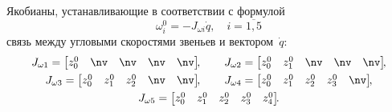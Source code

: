 Якобианы, устанавливающие в соответствии с формулой
\begin{equation}\label{eq_work_of_ang_jacobians}
    \omega^0_{i} = -J_{\omega i}\dot{q}, \quad i = \overline{1,5}
\end{equation}
связь между угловыми скоростями звеньев и вектором~$\dot{q}$:
\begin{gather}
    J_{\omega 1} =
    \begin{bmatrix}
        z^0_0 & \nv & \nv & \nv & \nv
    \end{bmatrix}\!\!,
    \qquad
    J_{\omega 2} =
    \begin{bmatrix}
        z^0_0 & z^0_1 & \nv & \nv & \nv
    \end{bmatrix}\!\!,
    \\
    J_{\omega 3} =
    \begin{bmatrix}
         z^0_0 & z^0_1 & z^0_2 & \nv & \nv
    \end{bmatrix}\!\!,
    \qquad
    J_{\omega 4} =
    \begin{bmatrix}
        z^0_0 & z^0_1 & z^0_2 & z^0_3 & \nv
    \end{bmatrix}\!\!,
    \\
    J_{\omega 5} =
    \begin{bmatrix}
        z^0_0 & z^0_1 & z^0_2 & z^0_3 & z^0_4
    \end{bmatrix}\!\!\ldotp
\end{gather}

